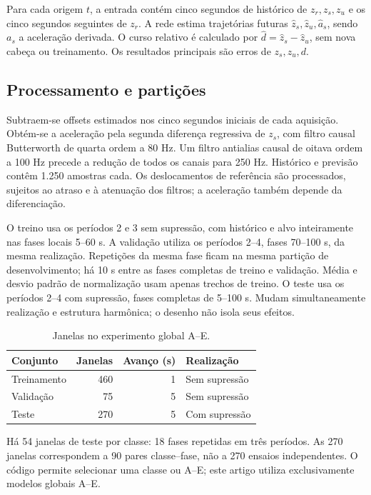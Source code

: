 \documentclass[conference]{IEEEtran}
\begin{document}
Para cada origem $t$, a entrada contém cinco segundos de histórico de $z_r,z_s,z_u$ e os cinco segundos seguintes de $z_r$. A rede estima trajetórias futuras $\hat z_s,\hat z_u,\hat a_s$, sendo $a_s$ a aceleração derivada. O curso relativo é calculado por $\hat d=\hat z_s-\hat z_u$, sem nova cabeça ou treinamento. Os resultados principais são erros de $z_s,z_u,d$.

\subsection{Processamento e partições}
Subtraem-se offsets estimados nos cinco segundos iniciais de cada aquisição. Obtém-se a aceleração pela segunda diferença regressiva de $z_s$, com filtro causal Butterworth de quarta ordem a 80 Hz. Um filtro antialias causal de oitava ordem a 100 Hz precede a redução de todos os canais para 250 Hz. Histórico e previsão contêm 1.250 amostras cada. Os deslocamentos de referência são processados, sujeitos ao atraso e à atenuação dos filtros; a aceleração também depende da diferenciação.

O treino usa os períodos 2 e 3 sem supressão, com histórico e alvo inteiramente nas fases locais 5--60 s. A validação utiliza os períodos 2--4, fases 70--100 s, da mesma realização. Repetições da mesma fase ficam na mesma partição de desenvolvimento; há 10 s entre as fases completas de treino e validação. Média e desvio padrão de normalização usam apenas trechos de treino. O teste usa os períodos 2--4 com supressão, fases completas de 5--100 s. Mudam simultaneamente realização e estrutura harmônica; o desenho não isola seus efeitos.

\begin{table}[t]
\caption{Janelas no experimento global A--E.}
\label{tab:data}
\centering
\begin{tabular}{lrrl}\toprule
Conjunto & Janelas & Avanço (s) & Realização\\\midrule
Treinamento & 460 & 1 & Sem supressão\\
Validação & 75 & 5 & Sem supressão\\
Teste & 270 & 5 & Com supressão\\\bottomrule
\end{tabular}
\end{table}

Há 54 janelas de teste por classe: 18 fases repetidas em três períodos. As 270 janelas correspondem a 90 pares classe--fase, não a 270 ensaios independentes. O código permite selecionar uma classe ou A--E; este artigo utiliza exclusivamente modelos globais A--E.
\end{document}
